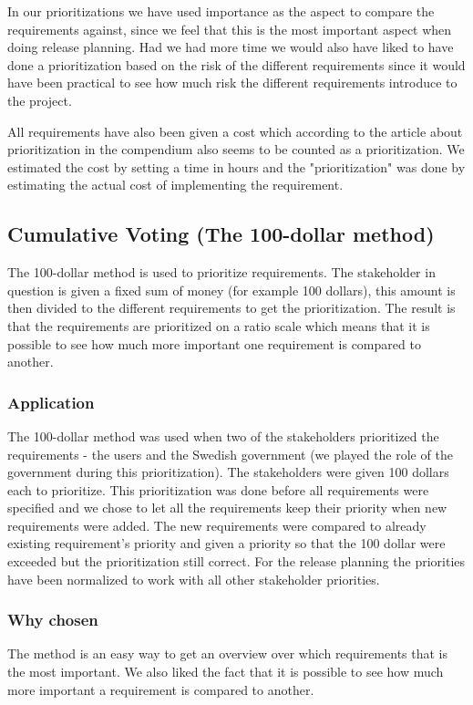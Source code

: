 \documentclass[a4paper]{article}
\begin{document}
	In our prioritizations we have used importance as the aspect to compare the requirements against, since we feel that this is the most important aspect when doing release planning. Had we had more time we would also have liked to have done a prioritization based on the risk of the different requirements since it would have been practical to see how much risk the different requirements introduce to the project.
	
	All requirements have also been given a cost which according to the article about prioritization in the compendium also seems to be counted as a prioritization. We estimated the cost by setting a time in hours and the "prioritization" was done by estimating the actual cost of implementing the requirement.

	\subsection{Cumulative Voting (The 100-dollar method)}
		The 100-dollar method is used to prioritize requirements. The stakeholder in question is given a fixed sum of money (for example 100 dollars), this amount is then divided to the different requirements to get the prioritization. The result is that the requirements are prioritized on a ratio scale which means that it is possible to see how much more important one requirement is compared to another.   
		\subsubsection{Application}
			The 100-dollar method was used when two of the stakeholders prioritized the requirements - the users and the Swedish government (we played the role of the government during this prioritization). The stakeholders were given 100 dollars each to prioritize. This prioritization was done before all requirements were specified and we chose to let all the requirements keep their priority when new requirements were added. The new requirements were compared to already existing requirement's priority and given a priority so that the 100 dollar were exceeded but the prioritization still correct. For the release planning the priorities have been normalized to work with all other stakeholder priorities. 
		\subsubsection{Why chosen}
			The method is an easy way to get an overview over which requirements that is the most important. We also liked the fact that it is possible to see how much more important a requirement is compared to another.
\end{document}
